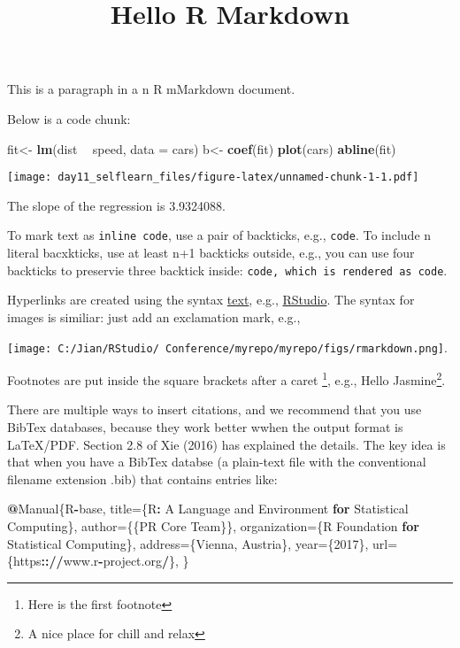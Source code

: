 \documentclass[]{article}
\title{Hello R Markdown}
\author{}
\date{}
\newenvironment{Shaded}{\begin{snugshade}}{\end{snugshade}}
\newcommand{\KeywordTok}[1]{\textcolor[rgb]{0.13,0.29,0.53}{\textbf{#1}}}
\newcommand{\DataTypeTok}[1]{\textcolor[rgb]{0.13,0.29,0.53}{#1}}
\newcommand{\DecValTok}[1]{\textcolor[rgb]{0.00,0.00,0.81}{#1}}
\newcommand{\StringTok}[1]{\textcolor[rgb]{0.31,0.60,0.02}{#1}}
\newcommand{\ControlFlowTok}[1]{\textcolor[rgb]{0.13,0.29,0.53}{\textbf{#1}}}
\newcommand{\OperatorTok}[1]{\textcolor[rgb]{0.81,0.36,0.00}{\textbf{#1}}}
\newcommand{\ErrorTok}[1]{\textcolor[rgb]{0.64,0.00,0.00}{\textbf{#1}}}
\newcommand{\NormalTok}[1]{#1}
\let\rmarkdownfootnote\footnote%
\def\footnote{\protect\rmarkdownfootnote}
\begin{document}
\maketitle

This is a paragraph in a n R mMarkdown document.

Below is a code chunk:

\begin{Shaded}
\begin{Highlighting}[]
\NormalTok{fit<-}\StringTok{ }\KeywordTok{lm}\NormalTok{(dist }\OperatorTok{~}\StringTok{ }\NormalTok{speed, }\DataTypeTok{data =}\NormalTok{ cars)}
\NormalTok{b<-}\StringTok{ }\KeywordTok{coef}\NormalTok{(fit)}
\KeywordTok{plot}\NormalTok{(cars)}
\KeywordTok{abline}\NormalTok{(fit)}
\end{Highlighting}
\end{Shaded}

\texttt{[image: day11\_selflearn\_files/figure-latex/unnamed-chunk-1-1.pdf]}

The slope of the regression is 3.9324088.

To mark text as \texttt{inline\ code}, use a pair of backticks, e.g.,
\texttt{code}. To include n literal bacxkticks, use at least n+1
backticks outside, e.g., you can use four backticks to preservie three
backtick inside:
\texttt{code\textasciigrave{}\textasciigrave{}\textasciigrave{}\textasciigrave{}\textasciigrave{},\ which\ is\ rendered\ as\ \textasciigrave{}\textasciigrave{}\textasciigrave{}code}.

Hyperlinks are created using the syntax \href{link}{text}, e.g.,
\href{https://www.rstudio.com}{RStudio}. The syntax for images is
similiar: just add an exclamation mark, e.g.,

\texttt{[image: C:/Jian/RStudio/ Conference/myrepo/myrepo/figs/rmarkdown.png]}.

Footnotes are put inside the square brackets after a caret \footnote{Here
  is the first footnote}, e.g., Hello Jasmine\footnote{A nice place for
  chill and relax}.

There are multiple ways to insert citations, and we recommend that you
use BibTex databases, because they work better wwhen the output format
is LaTeX/PDF. Section 2.8 of Xie (2016) has explained the details. The
key idea is that when you have a BibTex databse (a plain-text file with
the conventional filename extension .bib) that contains entries like:

\begin{Shaded}
\begin{Highlighting}[]
\OperatorTok{@}\NormalTok{Manual\{R}\OperatorTok{-}\NormalTok{base,}
\NormalTok{  title=\{R}\OperatorTok{:}\StringTok{ }\NormalTok{A Language and Environment }\ControlFlowTok{for}\NormalTok{ Statistical Computing\},}
\NormalTok{  author=\{\{PR Core Team\}\},}
\NormalTok{  organization=\{R Foundation }\ControlFlowTok{for}\NormalTok{ Statistical Computing\},}
\NormalTok{  address=\{Vienna, Austria\},}
\NormalTok{year=\{}\DecValTok{2017}\NormalTok{\},}
\NormalTok{url=\{https}\OperatorTok{::}\ErrorTok{//}\NormalTok{www.r}\OperatorTok{-}\NormalTok{project.org}\OperatorTok{/}\NormalTok{\},}
\NormalTok{\}}
\end{Highlighting}
\end{Shaded}
\end{document}
